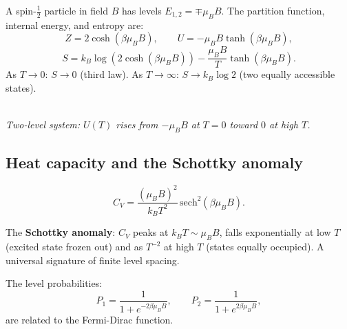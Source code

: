 \begin{example}
A spin-$\tfrac{1}{2}$ particle in field $B$ has levels $E_{1,2} = \mp\mu_B B$. The partition function, internal energy, and entropy are:
\begin{equation}
    Z = 2\cosh(\beta\mu_B B), \qquad
    U = -\mu_B B \tanh(\beta\mu_B B),
\end{equation}
\begin{equation}
    S = k_B\log\!\left(2\cosh(\beta\mu_B B)\right) - \frac{\mu_B B}{T}\tanh(\beta\mu_B B).
\end{equation}
As $T \to 0$: $S \to 0$ (third law). As $T \to \infty$: $S \to k_B\log 2$ (two equally accessible states).

\begin{center}
\\[3pt]
{\small\itshape Two-level system: $U(T)$ rises from $-\mu_B B$ at $T=0$ toward $0$ at high $T$.}
\end{center}

\subsection*{Heat capacity and the Schottky anomaly}

\begin{equation}
    C_V = \frac{(\mu_B B)^2}{k_B T^2}\,\mathrm{sech}^2(\beta\mu_B B).
\end{equation}

The \textbf{Schottky anomaly}: $C_V$ peaks at $k_BT \sim \mu_B B$, falls exponentially at low $T$ (excited state frozen out) and as $T^{-2}$ at high $T$ (states equally occupied). A universal signature of finite level spacing.

The level probabilities:
\begin{equation}
    P_1 = \frac{1}{1 + e^{-2\beta\mu_B B}}, \qquad
    P_2 = \frac{1}{1 + e^{2\beta\mu_B B}},
\end{equation}
are related to the Fermi-Dirac function.
\end{example}

